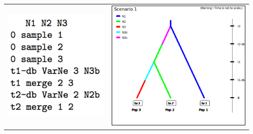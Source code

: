 \begin{center}
\begin{tabular}{cc}
\includegraphics[scale=0.5]{code_scenario_05-1}  & \includegraphics[scale=0.4]{test3pop_scenario_1} \tabularnewline
\end{tabular}
\par\end{center}

